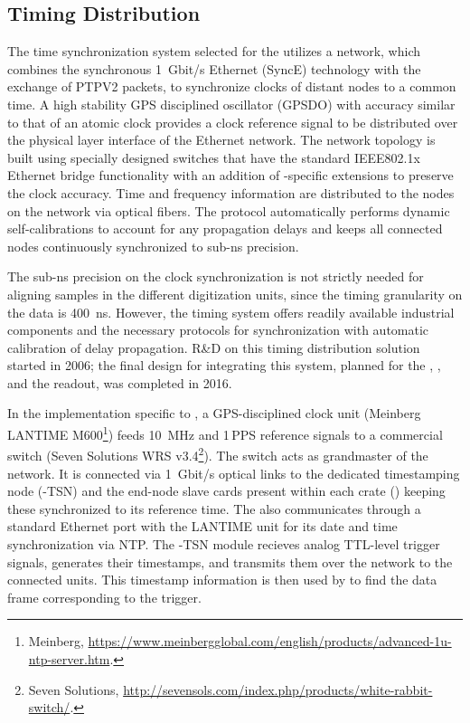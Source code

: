 \subsection{Timing Distribution}
\label{ssec:dp-tpcelec-wr}
The time synchronization system selected for the  utilizes a  network, which combines the synchronous \SI{1}{Gbit/s} Ethernet (SyncE) technology with the exchange of PTPV2 packets, to synchronize clocks of distant nodes to a common time. A high stability GPS disciplined oscillator (GPSDO) with  accuracy similar to that of an atomic clock provides a clock reference signal to be distributed over the physical layer interface of the  Ethernet network. The network topology is built using specially designed switches that have the standard IEEE802.1x Ethernet bridge functionality with an addition of -specific extensions to preserve the clock accuracy. Time and frequency information are distributed to the nodes on the  network via optical fibers. The  protocol automatically performs dynamic self-calibrations to account for any propagation delays and keeps all connected nodes continuously synchronized to sub-ns precision. 

The sub-ns precision on the clock synchronization is not strictly needed for aligning samples in the different  digitization units, since the timing granularity on the data is \SI{400}{ns}. However, the  timing system offers readily available industrial components and the necessary protocols for synchronization with automatic calibration of delay propagation. R\&D on this timing distribution solution started in 2006; the final design for integrating this system, planned for the , , and the  readout, was completed in 2016. 

In the implementation specific to , a GPS-disciplined clock unit (Meinberg LANTIME M600\footnote{Meinberg\texttrademark{}, \url{https://www.meinbergglobal.com/english/products/advanced-1u-ntp-server.htm}.}) feeds \SI{10}{MHz} and \num{1}\,PPS reference signals to a commercial  switch (Seven Solutions WRS v3.4\footnote{Seven Solutions\texttrademark{}, \url{http://sevensols.com/index.php/products/white-rabbit-switch/}.}). The switch acts as grandmaster of the  network. It is connected via \SI{1}{Gbit/s} optical links to the dedicated  timestamping node (-TSN) and the  end-node slave cards present within each  crate () keeping these synchronized to its reference time. The  also communicates through a standard Ethernet port with the LANTIME unit for its date and time synchronization via NTP. The -TSN module recieves analog TTL-level trigger signals, generates their timestamps, and transmits them over the  network to the connected  units. This timestamp information is then used by  to find the data frame corresponding to the trigger. 

